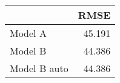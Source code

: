 
\begin{tabular}{l|r}
\hline
  & RMSE\\
\hline
Model A & 45.191\\
\hline
Model B & 44.386\\
\hline
Model B auto & 44.386\\
\hline
\end{tabular}